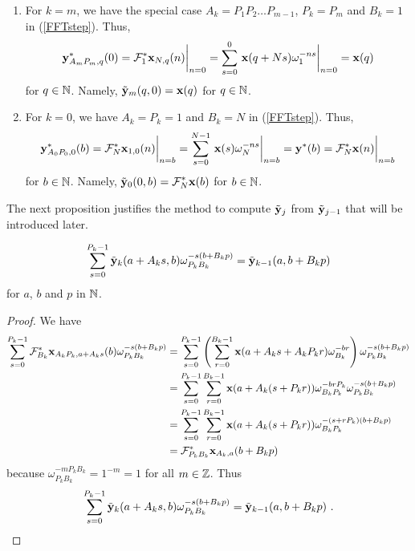 \begin{rmkList}
\begin{enumerate}
\item For $k=m$, we have the special case $A_k=P_1 P_2 \ldots P_{m-1}$,
$P_k = P_m$ and $B_k=1$ in (\ref{FFTstep}).  Thus,
\[
\mathbf{y}^\ast_{A_m P_m,q}(0) = \mathcal{F}^\ast_1 \mathbf{x}_{N, q}(n) \bigg|_{n=0}
= \sum_{s=0}^{0}\, \mathbf{x}(q+Ns) \omega_1^{-ns}\bigg|_{n=0} = \mathbf{x}(q)
\]
for $q \in \mathbb{N}$.  Namely, $\displaystyle \tilde{\mathbf{y}}_m(q,0) = \mathbf{x}(q)$ for
$q \in \mathbb{N}$.
\item For $k=0$, we have $A_k = P_k = 1$ and $B_k = N$ in
(\ref{FFTstep}).  Thus,
\[
\mathbf{y}^\ast_{A_0 P_0, 0}(b) = \mathcal{F}^\ast_N \mathbf{x}_{1,0}(n) \bigg|_{n=b}
= \sum_{s=0}^{N-1}\, \mathbf{x}(s) \omega_N^{-ns}\bigg|_{n=b}
= \mathbf{y}^\ast(b)
= \mathcal{F}^\ast_N \mathbf{x}(n)\bigg|_{n=b}
\]
for $b \in \mathbb{N}$.  Namely,
$\displaystyle \tilde{\mathbf{y}}_0(0,b) = \mathcal{F}^\ast_N \mathbf{x}(b)$
for $b \in \mathbb{N}$.
\end{enumerate}
\end{rmkList}

The next proposition justifies the method to compute $\tilde{\mathbf{y}}_j$ from
$\tilde{\mathbf{y}}_{j-1}$ that will be introduced later.

\begin{prop}
\[
\sum_{s=0}^{P_k-1} \tilde{\mathbf{y}}_k(a+A_k s, b) \omega_{P_k B_k}^{-s(b+B_k p)}
= \tilde{\mathbf{y}}_{k-1}(a, b+B_k p)
\]
for $a$, $b$ and $p$ in $\mathbb{N}$.
\label{heart_of_FFT}
\end{prop}

\begin{proof}
We have
\begin{align*}
\sum_{s=0}^{P_k-1} \mathcal{F}^\ast_{B_k} \mathbf{x}_{A_k P_k,a+A_k s } (b) 
\omega_{P_k B_k}^{-s(b+B_k p)}
&= \sum_{s=0}^{P_k-1} \left( \sum_{r=0}^{B_k-1} \mathbf{x}(a+A_k s + A_k P_k r)
\omega_{B_k}^{-br} \right) \omega_{P_k B_k}^{-s(b+B_k p)}  \\
&= \sum_{s=0}^{P_k-1} \sum_{r=0}^{B_k-1} \mathbf{x}(a+ A_k (s + P_k r))
\omega_{B_k P_k}^{-brP_k} \omega_{P_k B_k}^{-s(b+B_k p)}  \\
&= \sum_{s=0}^{P_k-1} \sum_{r=0}^{B_k-1} \mathbf{x}(a+ A_k (s + P_k r))
\omega_{B_k P_k}^{-(s+rP_k)(b+B_k p)}  \\
&= \mathcal{F}^\ast_{P_kB_k}\mathbf{x}_{A_k,a} (b+B_k p)
\end{align*}
because $\omega_{P_kB_k}^{-mP_kB_k} = 1^{-m} = 1$ for all $m\in \mathbb{Z}$.
Thus
\[
\sum_{s=0}^{P_k-1} \tilde{\mathbf{y}}_k(a+A_k s, b) \omega_{P_k B_k}^{-s(b+B_k p)}
= \tilde{\mathbf{y}}_{k-1}(a, b+B_k p) \ .  \qedhere
\]
\end{proof}

